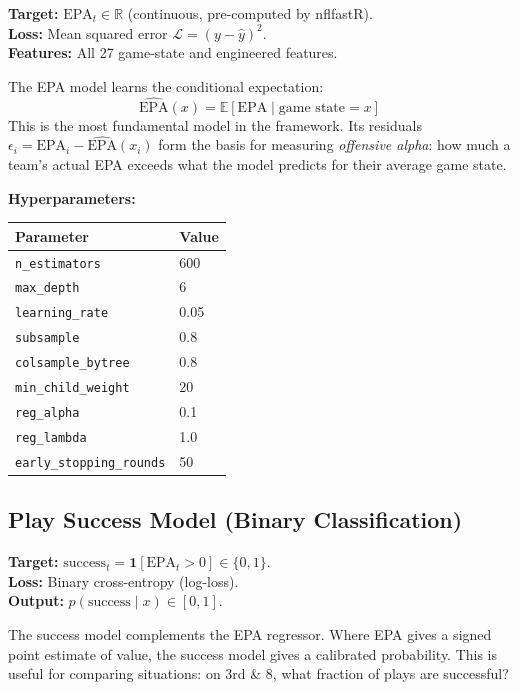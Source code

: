 \documentclass[11pt]{article}
\newcommand{\E}{\mathbb{E}}
\newcommand{\R}{\mathbb{R}}
\begin{document}
\textbf{Target:} $\text{EPA}_t \in \R$ (continuous, pre-computed by nflfastR).\\
\textbf{Loss:} Mean squared error $\mathcal{L} = (y - \hat{y})^2$.\\
\textbf{Features:} All 27 game-state and engineered features.

The EPA model learns the conditional expectation:
\begin{equation}
  \hat{\text{EPA}}(x) = \E[\text{EPA} \mid \text{game state} = x]
\end{equation}
This is the most fundamental model in the framework. Its residuals
$\epsilon_i = \text{EPA}_i - \hat{\text{EPA}}(x_i)$
form the basis for measuring \emph{offensive alpha}: how much a team's
actual EPA exceeds what the model predicts for their average game state.

\textbf{Hyperparameters:}
\begin{table}[H]
\centering
\begin{tabular}{ll}
\toprule
Parameter & Value \\
\midrule
\texttt{n\_estimators} & 600 \\
\texttt{max\_depth} & 6 \\
\texttt{learning\_rate} & 0.05 \\
\texttt{subsample} & 0.8 \\
\texttt{colsample\_bytree} & 0.8 \\
\texttt{min\_child\_weight} & 20 \\
\texttt{reg\_alpha} & 0.1 \\
\texttt{reg\_lambda} & 1.0 \\
\texttt{early\_stopping\_rounds} & 50 \\
\bottomrule
\end{tabular}
\end{table}

\subsection{Play Success Model (Binary Classification)}

\textbf{Target:} $\text{success}_t = \mathbf{1}[\text{EPA}_t > 0] \in \{0,1\}$.\\
\textbf{Loss:} Binary cross-entropy (log-loss).\\
\textbf{Output:} $p(\text{success} \mid x) \in [0,1]$.

The success model complements the EPA regressor. Where EPA gives a signed
point estimate of value, the success model gives a calibrated probability.
This is useful for comparing situations: on 3rd \& 8, what fraction of
plays are successful?
\end{document}

